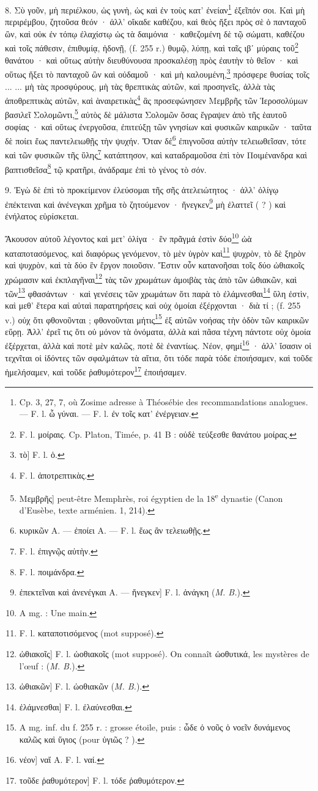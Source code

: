 \documentclass[landscape, a4paper, 11pt, oneside, polutonikogreek, french]{article}
\begin{document}
8. Σὺ γοῦν, μὴ περιέλκου, ὡς γυνὴ, ὡς καὶ ἐν τοὺς κατ' ἐνείαν\footnote{Cp. 3, 27, 7, où Zosime adresse à Théosébie des recommandations analogues. --- F. l. ὧ γύναι. --- F. l. ἐν τοῖς κατ' ἐνέργειαν.} ἐξεῖπόν σοι. Καὶ μὴ περιρέμβου, ζητοῦσα θεόν · ἀλλ' οἴκαδε καθέζου, καὶ θεὸς ἥξει πρὸς σὲ ὁ πανταχοῦ ὢν, καὶ οὐκ ἐν τόπῳ ἐλαχίστῳ ὡς τὰ δαιμόνια · καθεζομένη δὲ τῷ σώματι, καθέζου καὶ τοῖς πάθεσιν, ἐπιθυμίᾳ, ἡδονῇ, (f. 255 r.) θυμῷ, λύπῃ, καὶ ταῖς ιβʹ μύραις τοῦ\footnote{F. l. μοίραις. Cp. Platon, Timée, p. 41 B : οὐδὲ τεύξεσθε θανάτου μοίρας.} θανάτου · καὶ οὕτως αὐτὴν διευθύνουσα προσκαλέσῃ πρὸς ἐαυτὴν τὸ θεῖον · καὶ οὕτως ἥξει τὸ πανταχοῦ ὢν καὶ οὐδαμοῦ · καὶ μὴ καλουμένη,\footnote{τὸ] F. l. ὁ.} πρόσφερε θυσίας τοῖς ... ... μὴ τὰς προσφύρους, μὴ τὰς θρεπτικὰς αὐτῶν, καὶ προσηνεῖς, ἀλλὰ τὰς ἀποθρεπτικὰς αὐτῶν, καὶ ὰναιρετικὰς\footnote{F. l. ἀποτρεπτικὰς.} ἃς προσεφώνησεν Μεμβρῆς τῶν Ἱεροσολύμων βασιλεῖ Σολομῶντι,\footnote{Mεμβρῆς] peut-être Memphrès, roi égyptien de la 18\textsuperscript{e} dynastie (Canon d'Eusèbe, texte arménien. 1, 214).} αὐτὸς δὲ μάλιστα Σολομῶν ὅσας ἔγραψεν ἀπὸ τῆς ἑαυτοῦ σοφίας · καὶ οὕτως ἐνεργοῦσα, ἐπιτεύξῃ τῶν γνησίων καὶ φυσικῶν καιρικῶν · ταῦτα δὲ ποίει ἕως παντελειωθῇς τὴν ψυχήν. Ὅταν δὲ\footnote{κυρικῶν A. --- ἐποίει A. --- F. l. ἕως ἂν τελειωθῇς.} ἐπιγνοῦσα αὐτὴν τελειωθεῖσαν, τότε καὶ τῶν φυσικῶν τῆς ὕλης\footnote{F. l. ἐπιγνῷς αὐτὴν.} κατάπτησον, καὶ καταδραμοῦσα ἐπὶ τὸν Ποιμένανδρα καὶ βαπτισθεῖσα\footnote{F. l. ποιμάνδρα.} τῷ κρατῆρι, ἀνάδραμε ἐπὶ τὸ γένος τὸ σόν.

9. Ἐγὼ δὲ ἐπὶ τὸ προκείμενον ἐλεύσομαι τῆς σῆς ἀτελειώτητος · ἀλλ' ὀλίγῳ ἐπέκτειναι καὶ ἀνένεγκαι χρῆμα τὸ ζητούμενον · ἤνεγκεν\footnote{ἐπεκτεῖναι καὶ ἀνενέγκαι A. --- ἤνεγκεν] F. l. ἀνάγκη (\emph{M. B.}).} μὴ ἐλαττεῖ ( ? ) καὶ ἐνήλατος εὑρίσκεται.

Ἄκουσον αὐτοῦ λέγοντος καὶ μετ' ὀλίγα · ἓν πρᾶγμά ἐστὶν δύο\footnote{A mg. : Une main.} ὠὰ καταποτασόμενος, καὶ διαφόρως γενόμενον, τὸ μὲν ὑγρὸν καὶ\footnote{F. l. καταποτισόμενος (mot supposé).} ψυχρὸν, τὸ δὲ ξηρὸν καὶ ψυχρὸν, καὶ τὰ δύο ἓν ἔργον ποιοῦσιν. Ἔστιν οὖν κατανοῆσαι τοῖς δύο ὠθιακοῖς χρώμασιν καὶ ἐκπλαγῆναι\footnote{ὠθιακοῖς] F. l. ὠοθιακοῖς (mot supposé). On connaît ὠοθυτικά, les mystères de l'œuf : (\emph{M. B.}).} τὰς τῶν χρωμάτων ἀμοιβὰς τὰς ἀπὸ τῶν ὠθιακῶν, καὶ τῶν\footnote{ὠθιακῶν] F. l. ὠοθιακῶν (\emph{M. B.}).} φθασάντων · καὶ γενέσεις τῶν χρωμάτων ὅτι παρὰ τὸ ἐλάμνεσθαι\footnote{ἐλάμνεσθαι] F. l. ἐλαύνεσθαι.} ὕλη ἐστὶν, καὶ μεθ' ἕτερα καὶ αὐταὶ παρατηρήσεις καὶ οὐχ ὁμοίαι ἐξέρχονται · διὰ τί ; (f. 255 v.) οὐχ ὅτι φθονοῦνται ; φθονοῦνται μήτις\footnote{A mg. inf. du f. 255 r. : grosse étoile, puis : ὧδε ὁ νοῦς ὁ νοεῖν δυνάμενος καλῶς καὶ ὕγιος (pour ὑγιῶς ? ).} ἐξ αὐτῶν νοήσας τὴν ὁδὸν τῶν καιρικῶν εὕρῃ. Ἀλλ' ἐρεῖ τις ὅτι οὐ μόνον τὰ ὀνόματα, ἀλλὰ καὶ πᾶσα τέχνη πάντοτε οὐχ ὁμοία ἐξέρχεται, ἀλλὰ καὶ ποτὲ μὲν καλῶς, ποτὲ δὲ ἐναντίως. Νέον, φημί\footnote{νέον] ναἵ A. F. l. ναί.} · ἀλλ' ἴσασιν οἱ τεχνῖται οἱ ἰδόντες τῶν σφαλμάτων τὰ αἴτια, ὅτι τόδε παρὰ τόδε ἐποιήσαμεν, καὶ τοῦδε ἡμελήσαμεν, καὶ τοῦδε ῥαθυμότερον\footnote{τοῦδε ῥαθυμότερον] F. l. τόδε ῥαθυμότερον.} ἐποιήσαμεν.
\end{document}
